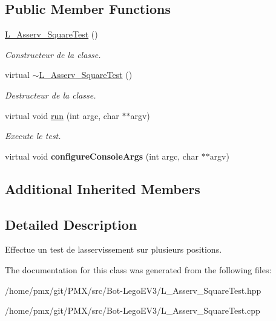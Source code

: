 \subsection*{Public Member Functions}
\begin{DoxyCompactItemize}
\item 
\mbox{\label{classL__Asserv__SquareTest_a65b5224e9f63cf58dc76b830471a7623}} 
\hyperlink{classL__Asserv__SquareTest_a65b5224e9f63cf58dc76b830471a7623}{L\+\_\+\+Asserv\+\_\+\+Square\+Test} ()
\begin{DoxyCompactList}\small\item\em Constructeur de la classe. \end{DoxyCompactList}\item 
\mbox{\label{classL__Asserv__SquareTest_a064c69e69e1cde17d7ab1b6604d97546}} 
virtual \hyperlink{classL__Asserv__SquareTest_a064c69e69e1cde17d7ab1b6604d97546}{$\sim$\+L\+\_\+\+Asserv\+\_\+\+Square\+Test} ()
\begin{DoxyCompactList}\small\item\em Destructeur de la classe. \end{DoxyCompactList}\item 
\mbox{\label{classL__Asserv__SquareTest_a6b3ec946f9fef73fd3720cf7408cb06f}} 
virtual void \hyperlink{classL__Asserv__SquareTest_a6b3ec946f9fef73fd3720cf7408cb06f}{run} (int argc, char $\ast$$\ast$argv)
\begin{DoxyCompactList}\small\item\em Execute le test. \end{DoxyCompactList}\item 
\mbox{\label{classL__Asserv__SquareTest_a62682ac508138b8f7cd359e2e956f73e}} 
virtual void {\bfseries configure\+Console\+Args} (int argc, char $\ast$$\ast$argv)
\end{DoxyCompactItemize}
\subsection*{Additional Inherited Members}


\subsection{Detailed Description}
Effectue un test de l\textquotesingle{}asservissement sur plusieurs positions. 

The documentation for this class was generated from the following files\+:\begin{DoxyCompactItemize}
\item 
/home/pmx/git/\+P\+M\+X/src/\+Bot-\/\+Lego\+E\+V3/L\+\_\+\+Asserv\+\_\+\+Square\+Test.\+hpp\item 
/home/pmx/git/\+P\+M\+X/src/\+Bot-\/\+Lego\+E\+V3/L\+\_\+\+Asserv\+\_\+\+Square\+Test.\+cpp\end{DoxyCompactItemize}
